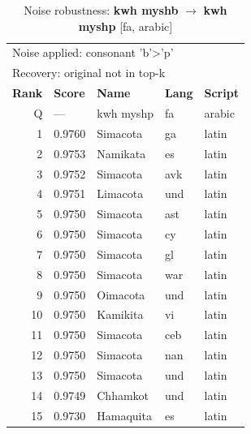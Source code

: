 \begin{table}[htbp]
\centering
\small
\caption{Noise robustness: \textbf{kwh myshb} $\rightarrow$ \textbf{kwh myshp} [fa, arabic]}
\label{tab:noise-32}
\begin{tabular}{rllll}
\toprule
\multicolumn{5}{l}{\small Noise applied: consonant 'b'>'p'} \\
\multicolumn{5}{l}{\small Recovery: original not in top-k} \\
\midrule
\textbf{Rank} & \textbf{Score} & \textbf{Name} & \textbf{Lang} & \textbf{Script} \\
\midrule
\rowcolor{gray!20} Q & --- & kwh myshp & fa & arabic \\
\midrule
1 & 0.9760 & Simacota & ga & latin \\
2 & 0.9753 & Namikata & es & latin \\
3 & 0.9752 & Simacota & avk & latin \\
4 & 0.9751 & Limacota & und & latin \\
5 & 0.9750 & Simacota & ast & latin \\
6 & 0.9750 & Simacota & cy & latin \\
7 & 0.9750 & Simacota & gl & latin \\
8 & 0.9750 & Simacota & war & latin \\
9 & 0.9750 & Oimacota & und & latin \\
10 & 0.9750 & Kamikita & vi & latin \\
11 & 0.9750 & Simacota & ceb & latin \\
12 & 0.9750 & Simacota & nan & latin \\
13 & 0.9750 & Simacota & und & latin \\
14 & 0.9749 & Chhamkot & und & latin \\
15 & 0.9730 & Hamaquita & es & latin \\
\bottomrule
\end{tabular}
\end{table}

